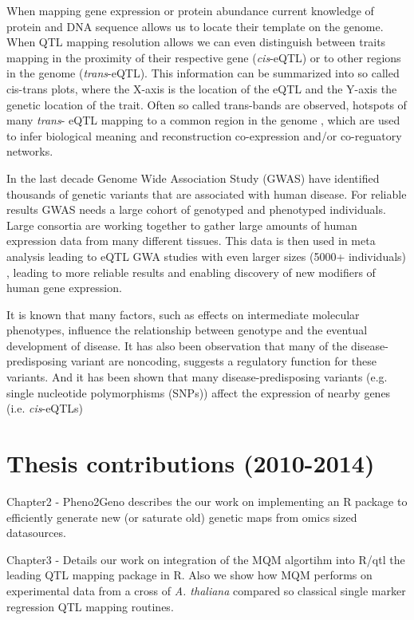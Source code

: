 When mapping gene expression or protein abundance current knowledge of protein and DNA sequence 
allows us to locate their template on the genome. When QTL mapping resolution allows we can even 
distinguish between traits mapping in the proximity of their respective gene (\emph{cis}-eQTL) 
or to other regions in the genome (\emph{trans}-eQTL). This information can be summarized into 
so called cis-trans plots, where the X-axis is the location of the eQTL and the Y-axis the genetic 
location of the trait. Often so called trans-bands are observed, hotspots of many \emph{trans}-
eQTL mapping to a common region in the genome \cite{Breitling:2008a}, which are used to infer 
biological meaning and reconstruction co-expression and/or co-reguatory networks.

In the last decade Genome Wide Association Study (GWAS) have identified thousands of genetic 
variants that are associated with human disease\cite{Hindorff:2009}. For reliable results GWAS 
needs a large cohort of genotyped and phenotyped individuals. Large consortia are working 
together to gather large amounts of human expression data from many different tissues. This 
data is then used in meta analysis leading to eQTL GWA studies with even larger sizes 
(5000+ individuals) \cite{Lude:2011}, leading to more reliable results and enabling discovery 
of new modifiers of human gene expression.

It is known that many factors, such as effects on intermediate molecular phenotypes, influence 
the relationship between genotype and the eventual development of disease. It has also been 
observation that many of the disease-predisposing variant are noncoding, suggests a regulatory 
function for these variants. And it has been shown that many disease-predisposing variants 
(e.g. single nucleotide polymorphisms (SNPs)) affect the expression of nearby genes (i.e. 
\emph{cis}-eQTLs)\cite{Powell:2012, Lude:2011, Zeller:2010}

\section{Thesis contributions (2010-2014)}
Chapter2 - Pheno2Geno describes the our work on implementing an R package to efficiently 
generate new (or saturate old) genetic maps from omics sized datasources.

Chapter3 - Details our work on integration of the MQM algortihm into R/qtl the leading 
QTL mapping package in R. Also we show how MQM performs on experimental data from a cross 
of \emph{A. thaliana} compared so classical single marker regression QTL mapping routines.

